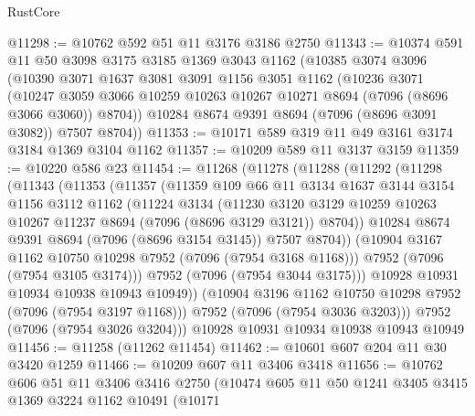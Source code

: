 \begin{lexlean}{RustCore}
\begin{coremodule}
@11298 := @10762 @592 @51 @11 @3176 @3186 @2750
@11343 := @10374
    @591
    @11
    @50
    @3098
    @3175
    @3185
    @1369
    @3043
    @1162
    (@10385
      @3074
      @3096
      (@10390
        @3071
        @1637
        @3081
        @3091
        @1156
        @3051
        @1162
        (@10236
          @3071
          (@10247 @3059 @3066 @10259 @10263 @10267 @10271 @8694 (@7096 (@8696 @3066 @3060)) @8704))
        @10284
        @8674
        @9391
        @8694
        (@7096 (@8696 @3091 @3082))
        @7507
        @8704))
@11353 := @10171 @589 @319 @11 @49 @3161 @3174 @3184 @1369 @3104 @1162
@11357 := @10209 @589 @11 @3137 @3159
@11359 := @10220 @586 @23
@11454 := @11268
    (@11278
      (@11288
        (@11292
          (@11298
            (@11343
              (@11353
                (@11357
                  (@11359
                    @109
                    @66
                    @11
                    @3134
                    @1637
                    @3144
                    @3154
                    @1156
                    @3112
                    @1162
                    (@11224
                      @3134
                      (@11230
                        @3120
                        @3129
                        @10259
                        @10263
                        @10267
                        @11237
                        @8694
                        (@7096 (@8696 @3129 @3121))
                        @8704))
                    @10284
                    @8674
                    @9391
                    @8694
                    (@7096 (@8696 @3154 @3145))
                    @7507
                    @8704))
                (@10904 @3167 @1162 @10750 @10298 @7952 (@7096 (@7954 @3168 @1168)))
                @7952
                (@7096 (@7954 @3105 @3174)))
              @7952
              (@7096 (@7954 @3044 @3175)))
            @10928
            @10931
            @10934
            @10938
            @10943
            @10949))
        (@10904 @3196 @1162 @10750 @10298 @7952 (@7096 (@7954 @3197 @1168)))
        @7952
        (@7096 (@7954 @3036 @3203)))
      @7952
      (@7096 (@7954 @3026 @3204)))
    @10928
    @10931
    @10934
    @10938
    @10943
    @10949
@11456 := @11258 (@11262 @11454)
@11462 := @10601 @607 @204 @11 @30 @3420 @1259
@11466 := @10209 @607 @11 @3406 @3418
@11656 := @10762
    @606
    @51
    @11
    @3406
    @3416
    @2750
    (@10474
      @605
      @11
      @50
      @1241
      @3405
      @3415
      @1369
      @3224
      @1162
      @10491
      (@10171

\end{coremodule}
\end{lexlean}
